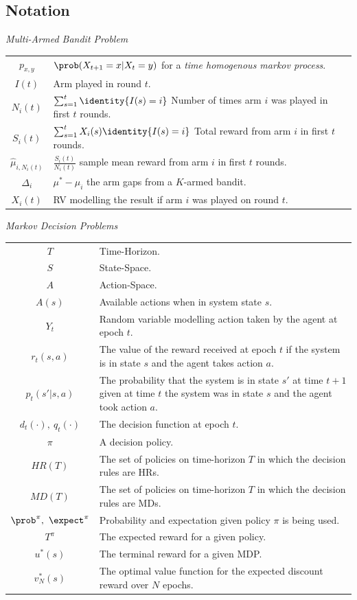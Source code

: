 \documentclass[11pt,a4paper]{article}
\begin{document}
\subsection{Notation}
  \textit{Multi-Armed Bandit Problem}\\
  \begin{tabular}{|c|l|}
    \hline
    $p_{x,y}$&$\prob(X_{t+1}=x|X_{t}=y)$ for a \textit{time homogenous markov process}.\\
    $I(t)$&Arm played in round $t$.\\
    $N_i(t)$&$\sum_{s=1}^t\identity\{I(s)=i\}$ Number of times arm $i$ was played in first $t$ rounds.\\
    $S_i(t)$&$\sum_{s=1}^tX_i(s)\identity\{I(s)=i\}$ Total reward from arm $i$ in first $t$ rounds.\\
    $\hat\mu_{i,N_i(t)}$&$\frac{S_i(t)}{N_i(t)}$ sample mean reward from arm $i$ in first $t$ rounds.\\
    $\Delta_i$&$\mu^*-\mu_i$ the arm gaps from a $K$-armed bandit.\\
    $X_i(t)$&RV modelling the result if arm $i$ was played on round $t$.\\
    \hline
  \end{tabular}

  \textit{Markov Decision Problems}\\
  \begin{tabular}{|c|l|}
    \hline
    $T$&Time-Horizon.\\
    $S$&State-Space.\\
    $A$&Action-Space.\\
    $A(s)$&Available actions when in system state $s$.\\
    $Y_t$&Random variable modelling action taken by the agent at epoch $t$.\\
    $r_t(s,a)$&The value of the reward received at epoch $t$ if the system is in state $s$ and the agent takes action $a$.\\
    $p_t(s'|s,a)$&The probability that the system is in state $s'$ at time $t+1$ given at time $t$ the system was in state $s$ and the agent took action $a$.\\
    $d_t(\cdot),\ q_t(\cdot)$&The decision function at epoch $t$.\\
    $\pi$&A decision policy.\\
    $HR(T)$&The set of policies on time-horizon $T$ in which the decision rules are HRs.\\
    $MD(T)$&The set of policies on time-horizon $T$ in which the decision rules are MDs.\\
    $\prob^\pi,\ \expect^\pi$&Probability and expectation given policy $\pi$ is being used.\\
    $T^\pi$ & The expected reward for a given policy.\\
    $u^*(s)$ & The terminal reward for a given MDP.\\
    $v_N^*(s)$ & The optimal value function for the expected discount reward over $N$ epochs.\\
    \hline
  \end{tabular}
\end{document}

